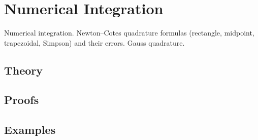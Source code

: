 
\section{Numerical Integration}
\label{sec:2.1.10-numerical-integration}

\begin{ticket}
Numerical integration. Newton–Cotes quadrature formulas (rectangle, midpoint, trapezoidal, Simpson) and their errors. Gauss quadrature.
\end{ticket}

\subsection*{Theory}

\subsection*{Proofs}

\subsection*{Examples}
